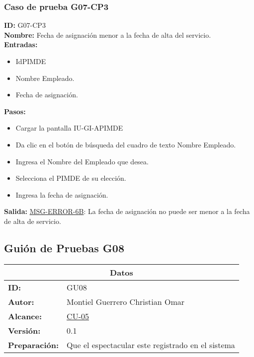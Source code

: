 \subsubsection{Caso de prueba G07-CP3}
\textbf{ID:} G07-CP3\\
\textbf{Nombre:} Fecha de asignación menor a la fecha de alta del servicio.\\
\textbf{Entradas:} 
\begin{itemize}
    \item IdPIMDE
    \item Nombre Empleado.
    \item Fecha de asignación.
\end{itemize}
\textbf{Pasos:}
\begin{itemize}
    \item Cargar la pantalla IU-GI-APIMDE
    \item Da clic en el botón de búsqueda del cuadro de texto Nombre Empleado.
    \item Ingresa el Nombre del Empleado que desea.
    \item Selecciona el PIMDE de su elección.
    \item Ingresa la fecha de asignación.
\end{itemize}
\textbf{Salida:}
\hyperlink{MSG-ERROR-6B}{MSG-ERROR-6B}: La fecha de asignación no puede ser menor a la fecha de alta de servicio.

\clearpage

\subsection{Guión de Pruebas G08}
\begin{table}[htbp]
\centering
\begin{tabular}{| p{5cm}| p{13cm} |} \hline
\multicolumn{2}{|c|}{\textbf{Datos}} \\ \hline
    \textbf{ID:}&GU08\\ \hline
    \textbf{Autor:}&Montiel Guerrero Christian Omar\\ \hline
    \textbf{Alcance:}&
    \hyperlink{CU:CU-05}{CU-05}\\ \hline
    \textbf{Versión:}&0.1\\ \hline
    \textbf{Preparación:}&Que el espectacular este registrado en el sistema\\ \hline
\end{tabular}
\end{table}

